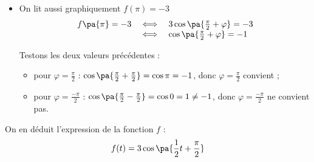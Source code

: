 \begin{methode}
\begin{correction}
\begin{itemize}
			\item On lit aussi graphiquement $f(\pi) = -3$
			      \[
				      \begin{array}{rcl}
					      f\pa{\pi}= -3 & \iff & 3\cos\pa{\tfrac{\pi}{2} + \varphi} = -3 \\
					                     & \iff & \cos\pa{\tfrac{\pi}{2} + \varphi} = -1
				      \end{array}
			      \]

			      Testons les deux valeurs précédentes :

			      \begin{itemize}
				      \item pour $\varphi = \frac{\pi}{2}$ : $\cos\pa{\frac{\pi}{2} + \frac{\pi}{2}} = \cos\pi = -1$, donc $\varphi = \frac{\pi}{2}$ convient ;
				      \item pour $\varphi = \frac{-\pi}{2}$ : $\cos\pa{\frac{\pi}{2} - \frac{\pi}{2}} = \cos 0 = 1 \neq -1$, donc $\varphi = \frac{-\pi}{2}$ ne convient pas.
			      \end{itemize}
		\end{itemize}

		On en déduit l'expression de la fonction $f$ :
		\[
			f(t) = 3\cos\pa{\dfrac{1}{2}t + \dfrac{\pi}{2}}
		\]
	\end{correction}
\end{methode}
